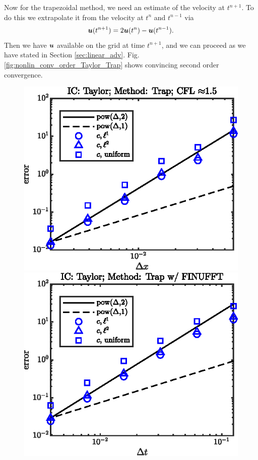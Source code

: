 \documentclass[11pt,letterpaper]{article}
\begin{document}
Now for the trapezoidal method, we need an estimate of the velocity at $t^{n+1}$. To do this we extrapolate it from the velocity at $t^n$ and $t^{n-1}$ via
\begin{align*}
    \boldsymbol{u}(t^{n+1}) = 2\boldsymbol{u}(t^n)-\boldsymbol{u}(t^{n-1}). 
\end{align*}
Then we have $\boldsymbol{u}$ available on the grid at time $t^{n+1}$, and we can proceed as we have stated in Section \ref{sec:linear_adv}. Fig. \ref{fig:nonlin_conv_order_Taylor_Trap} shows convincing second order convergence. 
\begin{figure}[H]
    \centering
    \includegraphics{figs/nonlin_conv_order_Taylor_Trap}
    \includegraphics{figs/nonlin_conv_order_Taylor_finu_Trap}

\end{figure}
\end{document}
